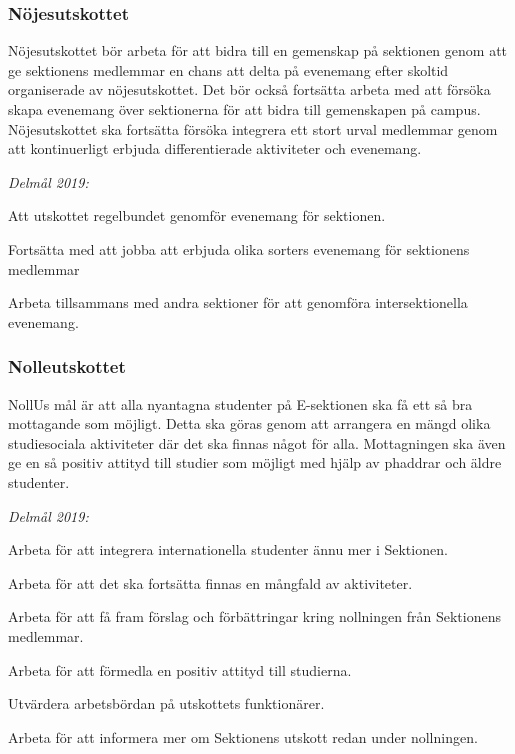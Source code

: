 \documentclass[../_main/handlingar.tex]{subfiles}
\begin{document}
\subsubsection*{Nöjesutskottet}
Nöjesutskottet bör arbeta för att bidra till en gemenskap på sektionen genom att ge sektionens medlemmar en chans att delta på evenemang efter skoltid organiserade av nöjesutskottet. Det bör också fortsätta arbeta med att försöka skapa evenemang över sektionerna för att bidra till gemenskapen på campus. Nöjesutskottet ska fortsätta försöka integrera ett stort urval medlemmar genom att kontinuerligt erbjuda differentierade aktiviteter och evenemang.

\emph{Delmål 2019:}
\begin{dashlist}
    \item Att utskottet regelbundet genomför evenemang för sektionen. 
    \item Fortsätta med att jobba att erbjuda olika sorters evenemang för sektionens medlemmar
    \item Arbeta tillsammans med andra sektioner för att genomföra intersektionella evenemang. 
\end{dashlist}

\newpage

\subsubsection*{Nolleutskottet}
NollUs mål är att alla nyantagna studenter på E-sektionen ska få ett så bra mottagande som möjligt. Detta ska göras genom att arrangera en mängd olika studiesociala aktiviteter där det ska finnas något för alla. Mottagningen ska även ge en så positiv attityd till studier som möjligt med hjälp av phaddrar och äldre studenter.

\emph{Delmål 2019:}
\begin{dashlist}
    \item Arbeta för att integrera internationella studenter ännu mer i Sektionen.
    \item Arbeta för att det ska fortsätta finnas en mångfald av aktiviteter.
    \item Arbeta för att få fram förslag och förbättringar kring nollningen från Sektionens medlemmar.
    \item Arbeta för att förmedla en positiv attityd till studierna.
    \item Utvärdera arbetsbördan på utskottets funktionärer.
    \item Arbeta för att informera mer om Sektionens utskott redan under nollningen.        
\end{dashlist}
\end{document}
